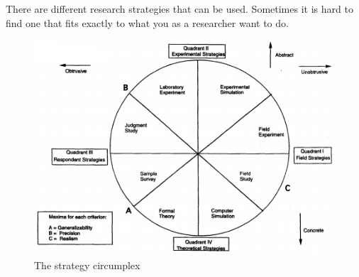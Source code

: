 There are different research strategies that can be used. Sometimes it is hard to find one that fits exactly to what you as a researcher want to do.
\begin{figure}
\begin{center}
\includegraphics[scale=0.5]{circumplex}
\caption[The strategy circumplex]{The strategy circumplex \cite{McGrath}}
\label{fig:circumplex}
\end{center}
\end{figure} 
